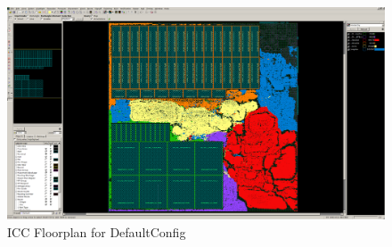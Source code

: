 \documentclass{article}
\begin{document}
\begin{figure}
  \begin{center}
    \includegraphics[width=0.95\linewidth]{figures/icc-rocket.png}
  \end{center}
  \caption{ICC Floorplan for DefaultConfig}
  \label{res:rocket-icc}
\end{figure}
\end{document}
